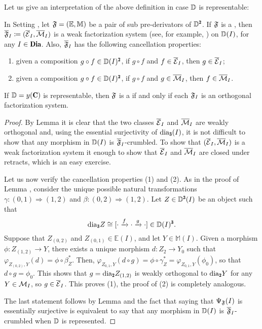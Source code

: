 Let us give an interpretation of the above definition in case $\mathbb{D}$ is representable:

\begin{lemma}\label{weak_and_cancellation}
In Setting , let $\mathfrak{F}=(\mathbb E,\mathbb M)$ be a pair of sub pre-derivators of $\D^\due$. If $\mathfrak{F}$ is a \dfs, then $\overline {\mathfrak{F}}_I \coloneqq (\overline{\mathcal{E}}_I,\overline {\mathcal{M}}_I)$ is a weak factorization system (see, for example, \cite[§\textbf{2}]{riehl2008factorization}) on $\mathbb{D}(I)$, for any $I\in \Dia$. Also, $\overline {\mathfrak{F}}_I$ has the following cancellation properties:
\begin{enumerate}
\item given a composition $g\circ f\in \D(I)^\due$, if $g\circ f$ and $f\in \overline{\mathcal{E}}_I$, then $g\in \overline{\mathcal{E}}_I$;
\item given a composition $g\circ f\in \D(I)^\due$, if $g\circ f$ and $g\in \overline{\mathcal{M}}_I$, then $f\in \overline{\mathcal{M}}_I$.
\end{enumerate}
If $\D=y(\C)$ is representable, then $\mathfrak{F}$ is a \dfs if and only if each $\mathfrak{F}_I$ is an orthogonal factorization system.
\end{lemma}
\begin{proof}
By Lemma  it is clear that the two classes $\overline{\mathcal{E}}_I$ and $\overline {\mathcal{M}}_I$ are weakly orthogonal and, using the essential surjectivity of $\dia_\tre(I)$, it is not difficult to show that any morphism in $\mathbb{D}(I)$ is $\overline{\mathfrak{F}}_I$-crumbled. To show that $(\overline{\mathcal{E}}_I,\overline {\mathcal{M}}_I)$ is a weak factorization system it enough to show that $\overline{\mathcal{E}}_I$ and $\overline {\mathcal{M}}_I$ are closed under retracts, which is an easy exercise. 

Let us now verify the cancellation properties (1) and (2). As in the proof of Lemma , consider the unique possible natural transformations $\gamma\colon (0,1)\Rightarrow (1,2)$ and $\beta\colon (0,2)\Rightarrow (1,2)$. Let $Z\in \D^\tre(I)$ be an object such that 
\[
\dia_{\tre}Z\cong[ \cdot \xto{f}\cdot\xto{g}\cdot]\in \D(I)^\tre.
\] 
Suppose that $Z_{(0,2)}$ and $Z_{(0,1)}\in \mathbb E(I)$, and let $Y\in \mathbb M(I)$. Given a morphism $\phi\colon Z_{(1,2)}\to Y$, there exists a unique morphism $d\colon Z_2\to Y_0$ such that $\varphi_{Z_{(0,2)},Y}(d)=\phi\circ \beta^*_Z$. Then, $\varphi_{Z_{0,1}, Y}(d\circ g)=\phi\circ\gamma^*_Z=\varphi_{Z_{0,1}, Y}(\phi_0)$, so that $d\circ g=\phi_0$. This shows that $g=\dia_{\due}Z_{(1,2)}$ is weakly orthogonal to $\dia_\due Y$ for any $Y\in \mathcal{M}_I$, so $g\in \overline {\mathcal{E}}_I$. This proves (1), the proof of (2) is completely analogous. 

The last statement follows by Lemma  and the fact that saying that $\Psi_{\mathfrak{F}}(I)$ is essentially surjective is equivalent to say that any morphism in $\mathbb{D}(I)$ is $\overline {\mathfrak{F}}_I$-crumbled when $\mathbb{D}$ is represented. 
\end{proof}


